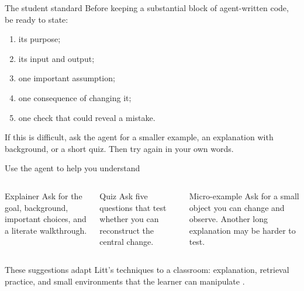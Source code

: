 \begin{frame}{The student standard}
  Before keeping a substantial block of agent-written code, be ready to state:
  \begin{enumerate}
    \item its purpose;
    \item its input and output;
    \item one important assumption;
    \item one consequence of changing it;
    \item one check that could reveal a mistake.
  \end{enumerate}

  \vfill
  If this is difficult, ask the agent for a smaller example, an explanation with
  background, or a short quiz. Then try again in your own words.
\end{frame}

\begin{frame}{Use the agent to help you understand}
  \begin{columns}[T,onlytextwidth]
      \begin{block}{Explainer}
        Ask for the goal, background, important choices, and a literate walkthrough.
      \end{block}
      \begin{block}{Quiz}
        Ask five questions that test whether you can reconstruct the central change.
      \end{block}
      \begin{block}{Micro-example}
        Ask for a small object you can change and observe. Another long explanation may be harder to test.
      \end{block}
  \end{columns}

  \vfill
  These suggestions adapt Litt's techniques to a classroom: explanation,
  retrieval practice, and small environments that the learner can manipulate
  \citep{litt2026}.
\end{frame}

